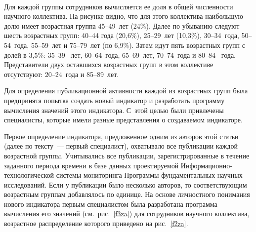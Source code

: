 \begin{multicols}{2}
\begin{figure*} %
\vspace*{1pt}
\begin{center}
\mbox{%
\epsfxsize=101.611mm
}
\end{center}
\vspace*{-9pt}
\end{figure*}

   Для каждой группы сотрудников вы\-чис\-ля\-ется ее доля в общей численности научного
коллектива. На рисунке видно, что для этого коллектива наибольшую долю имеет возрастная
группа 45--49~лет (24\%). Далее по убыванию следуют шесть возрастных групп: 40--44 года
(20,6\%), 25--29~лет (10,3\%), 30--34~года, 50--54~года, 55--59~лет и 75--79~лет (по 6,9\%).
Затем идут пять возрастных групп с долей в 3,5\%: 35--39~ лет, 60--64~года, 65--69~лет,
   70--74~года и 80--84~ года. Представители двух оставшихся возрастных групп в этом
коллективе отсутствуют: 20--24~года и 85--89~лет.

   Для определения публикационной активности каждой из возрастных групп была
предпринята попытка создать новый индикатор и разработать программу вычисления
значений этого индикатора. С~этой целью были привлечены специалисты, которые имели
разные представления о со\-зда\-ва\-емом индикаторе.

   Первое определение индикатора, предложенное одним из авторов этой статьи (далее по
тексту~--- первый специалист), охватывало все публикации каждой возрастной группы.
Учитывались все пуб\-ли\-ка\-ции, зарегистрированные в течение заданного периода времени в
базе данных проектируемой Информационно-технологической системы  мониторинга
Программы фундаментальных научных исследований. Если у публикации было несколько
авторов, то соответствующим возрастным группам добавлялось по единице. На основе
личностного понимания нового индикатора первым специалистом была разработана
программа вычисления его значений (см.\ рис.~\ref{f3za}) для сотрудников научного
коллектива, возрастное распределение которого приведено на рис.~\ref{f2za}.

\begin{figure*} %
\vspace*{1pt}
\begin{center}
\mbox{%
\epsfxsize=101.886mm
}
\end{center}
\vspace*{-9pt}
\end{figure*}


\end{multicols}
